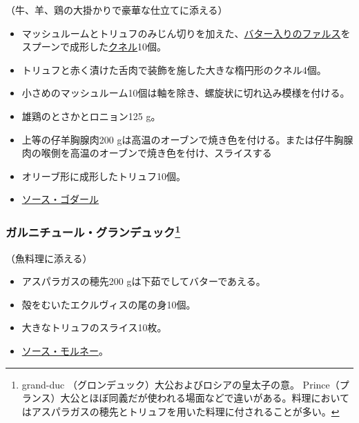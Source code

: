 \begin{recette}


（牛、羊、鶏の大掛かりで豪華な仕立てに添える）

\begin{itemize}
\item
  マッシュルームとトリュフのみじん切りを加えた、\protect\hyperlink{farce-a}{バター入りのファルス}をスプーンで成形した\protect\hyperlink{quenelles}{クネル}10個。
\item
  トリュフと赤く漬けた舌肉で装飾を施した大きな楕円形のクネル4個。
\item
  小さめのマッシュルーム10個は軸を除き、螺旋状に切れ込み模様を付ける。
\item
  雄鶏のとさかとロニョン125 g。
\item
  上等の仔羊胸腺肉200
  gは高温のオーブンで焼き色を付ける。または仔牛胸腺肉の喉側を高温のオーブンで焼き色を付け、スライスする
\item
  オリーブ形に成形したトリュフ10個。
\item
  \protect\hyperlink{sauce-godard}{ソース・ゴダール}
\end{itemize}

\atoaki{}

\hypertarget{garniture-grand-duc}{%
\subsubsection[ガルニチュール・グランデュック]{\texorpdfstring{ガルニチュール・グランデュック\footnote{grand-duc
  （グロンデュック）大公およびロシアの皇太子の意。
  Prince（プランス）大公とほぼ同義だが使われる場面などで違いがある。料理においてはアスパラガスの穂先とトリュフを用いた料理に付されることが多い。}}{ガルニチュール・グランデュック}}\label{garniture-grand-duc}}



（魚料理に添える）

\begin{itemize}
\item
  アスパラガスの穂先200 gは下茹でしてバターであえる。
\item
  殻をむいたエクルヴィスの尾の身10個。
\item
  大きなトリュフのスライス10枚。
\item
  \protect\hyperlink{sauce-mornay}{ソース・モルネー}。
\end{itemize}


\end{recette}
